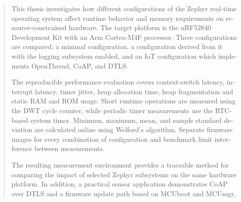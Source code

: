 \begin{otherlanguage}{english}
\renewcommand{\abstractname}{Abstract}
\begin{abstract}
	\addchaptertocentry{\abstractname} %

	This thesis investigates how different configurations of the Zephyr
	real-time operating system affect runtime behavior and memory requirements
	on resource-constrained hardware. The target platform is the nRF52840
	Development Kit with an Arm Cortex-M4F processor. Three configurations are
	compared: a minimal configuration, a configuration derived from it with the
	logging subsystem enabled, and an IoT configuration which implements
	OpenThread, CoAP, and DTLS.

	The reproducible performance evaluation covers context-switch latency,
	interrupt latency, timer jitter, heap allocation time, heap fragmentation
	and static RAM and ROM usage. Short runtime operations are measured using
	the DWT cycle counter, while periodic timer measurements use the RTC-based
	system timer. Minimum, maximum, mean, and sample standard deviation are
	calculated online using Welford's algorithm. Separate firmware images for
	every combination of configuration and benchmark limit interference between
	measurements.

	The resulting measurement environment provides a traceable method for
	comparing the impact of selected Zephyr subsystems on the same hardware
	platform. In addition, a practical sensor application demonstrates CoAP over
	DTLS and a firmware update path based on MCUboot and MCUmgr.
\end{abstract}
\end{otherlanguage}




\tableofcontents %

